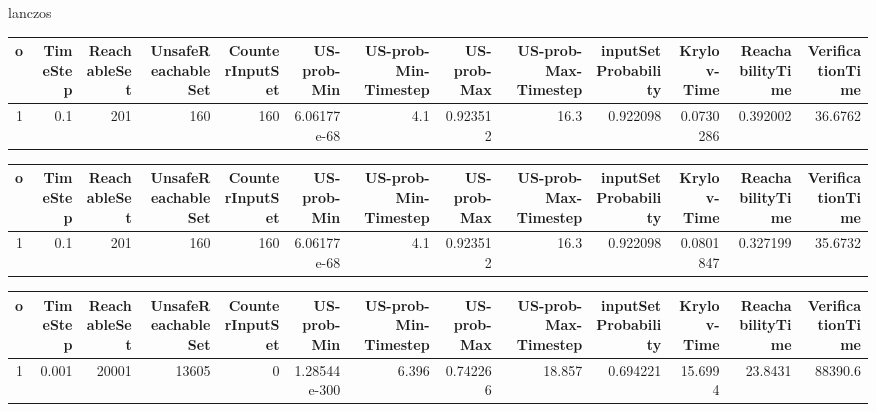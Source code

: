 lanczos
\begin{tabular}{rrrrrrrrrrrrr}
\hline
   o &   TimeStep &   ReachableSet &   UnsafeReachableSet &   CounterInputSet &   US-prob-Min &   US-prob-Min-Timestep &   US-prob-Max &   US-prob-Max-Timestep &   inputSet Probability &   Krylov-Time &   ReachabilityTime &   VerificationTime \\
\hline
   1 &        0.1 &            201 &                  160 &               160 &   6.06177e-68 &                    4.1 &      0.923512 &                   16.3 &               0.922098 &     0.0730286 &           0.392002 &            36.6762 \\
\hline
\end{tabular}
\begin{tabular}{rrrrrrrrrrrrr}
\hline
   o &   TimeStep &   ReachableSet &   UnsafeReachableSet &   CounterInputSet &   US-prob-Min &   US-prob-Min-Timestep &   US-prob-Max &   US-prob-Max-Timestep &   inputSet Probability &   Krylov-Time &   ReachabilityTime &   VerificationTime \\
\hline
   1 &        0.1 &            201 &                  160 &               160 &   6.06177e-68 &                    4.1 &      0.923512 &                   16.3 &               0.922098 &     0.0801847 &           0.327199 &            35.6732 \\
\hline
\end{tabular}
\begin{tabular}{rrrrrrrrrrrrr}
\hline
   o &   TimeStep &   ReachableSet &   UnsafeReachableSet &   CounterInputSet &   US-prob-Min &   US-prob-Min-Timestep &   US-prob-Max &   US-prob-Max-Timestep &   inputSet Probability &   Krylov-Time &   ReachabilityTime &   VerificationTime \\
\hline
   1 &      0.001 &          20001 &                13605 &                 0 &  1.28544e-300 &                  6.396 &      0.742266 &                 18.857 &               0.694221 &       15.6994 &            23.8431 &            88390.6 \\
\hline
\end{tabular}

